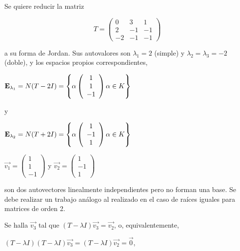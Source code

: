 \begin{example}
Se quiere  reducir la matriz 



 $$T=\left(\begin{array}{ccc} 0 & 3 & 1  \\ 2  & -1 & -1
\\ -2  & -1 & -1
\end{array}
 \right)$$ 

\bigskip

\noindent
a su forma de Jordan. Sus autovalores son $\lambda_1=2$ (simple) y  $\lambda_2=\lambda_3=-2$  (doble), y los espacios propios correspondientes,

\bigskip

$\bold E_{\lambda_1}=N(T-2 I )=\left\{\alpha   \left(\begin{array}{c} 1 \\ 1 
\\  -1
\end{array} \right)    \alpha \in K    \right\}$

\noindent 
y




$\bold E_{\lambda_2}=N(T+2 I )=\left\{\alpha   \left(\begin{array}{c} 1 \\ -1 
\\  1
\end{array} \right)    \alpha \in K    \right\}$

\bigskip


$\vec{v_1}=\left(\begin{array}{c} 1 \\ 1
\\ - 1 \end{array}\right)$ y $\vec{v_2}=\left(\begin{array}{c} 1 \\ -1
\\  1 \end{array}\right)$ 


\bigskip

\noindent 
son dos autovectores  linealmente independientes pero  no forman  una  base. Se debe realizar un trabajo análogo  al realizado en el caso de raíces iguales para matrices de orden 2.

Se halla $\vec{v_3}$ tal que $(T-\lambda I ) \vec{v_3}= \vec{v_2}$, 
o, equivalentemente, 

$(T-\lambda I ) (T-\lambda I ) \vec{v_3}= (T-\lambda I )\vec{v_2}= \Vec{0}$, 


\end{example}
